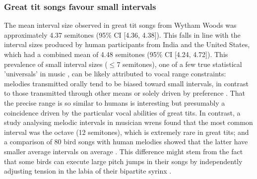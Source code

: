 \subsubsection{Great tit songs favour small intervals}
The mean interval size observed in great tit songs from Wytham Woods was approximately 4.37 semitones (95\% CI [4.36, 4.38]). This falls in line with the interval sizes produced by human participants from India and the United States, which had a combined mean of 4.48 semitones (95\% CI [4.24, 4.72]). This prevalence of small interval sizes ($\le$7 semitones), one of a few true statistical 'universals' in music \autocite{savage2015}, can be likely attributed to vocal range constraints: melodies transmitted orally tend to be biased toward small intervals, in contrast to those transmitted through other means or solely driven by preference \textcite{anglada-tort2023}. That the precise range is so similar to humans is interesting but presumably a coincidence driven by the particular vocal abilities of great tits. In contrast, a study analysing melodic intervals in musician wrens \autocite{doolittle2012} found that the most common interval was the octave (12 semitones), which is extremely rare in great tits; and a comparison of 80 bird songs with human melodies showed that the latter have smaller average intervals on average \autocite{tierney2011a}. This difference might stem from the fact that some birds can execute large pitch jumps in their songs by independently adjusting tension in the labia of their bipartite syrinx \autocite{suthers2004}.


